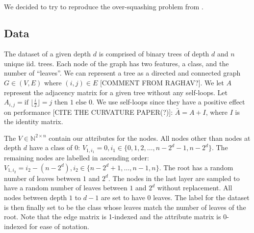 \documentclass[a4paper,12pt]{article}
\begin{document}
\subsection{}
We decided to try to reproduce the over-squashing problem from \cite{alon_bottleneck_2021}.
\subsection{Data}
The dataset of a given depth \(d\) is comprised of binary trees of depth \(d\) and \(n\) unique iid. trees. Each node of the graph has two features, a class, and the number of ``leaves''. We can represent a tree as a directed and connected graph \(G \in (V, E)\) where \((i, j) \in E\) [COMMENT FROM RAGHAV?].
We let \(A\) represent the adjacency matrix for a given tree without any self-loops. Let \(A_{i,j}= \text{if } \lfloor \frac{i}{2}\rfloor = j \text{ then } 1 \text{ else } 0\). We use self-loops since they have a positive effect on performance [CITE THE CURVATURE PAPER(?)]: \(\bar{A}=A+I\), where \(I\) is the identity matrix.

The \(V \in \mathbb{N}^{2 \times n}\) contain our attributes for the nodes. All nodes other than nodes at depth \(d\) have a class of 0: \(V_{1, i_{1}} = 0, i_{1} \in \{0, 1, 2, \ldots, n-2^{d}-1, n-2^{d}\}\). The remaining nodes are labelled in ascending order: \(V_{1, i_{2}}= i_{2}-(n-2^{d}), i_{2} \in \{n-2^{d}+1, \ldots, n-1, n\}\).
The root has a random number of leaves between \(1\) and \(2^{d}\). The nodes in the last layer are sampled to have a random number of leaves between \(1\) and \(2^{d}\) without replacement. All nodes between depth \(1\) to \(d-1\) are set to have 0 leaves. The label for the dataset is then finally set to be the class whose leaves match the number of leaves of the root. Note that the edge matrix is 1-indexed and the attribute matrix is 0-indexed for ease of notation.




\end{document}
